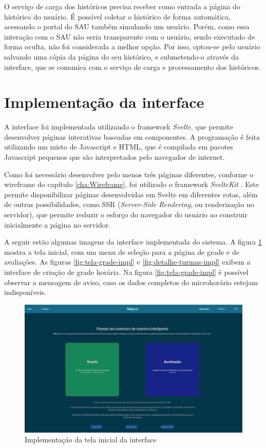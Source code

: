 O serviço de carga dos históricos precisa receber como entrada a página do histórico do usuário. É possível coletar o histórico de forma automática, acessando o portal do SAU também simulando um usuário. Porém, como essa interação com o SAU não seria transparente com o usuário, sendo executado de forma oculta, não foi considerada a melhor opção. Por isso, optou-se pelo usuário salvando uma cópia da página do seu histórico, e submetendo-o através da interface, que se comunica com o serviço de carga e processamento dos históricos. 

\section{Implementação da interface}
\label{sec:Implementação da interface}

A interface foi implementada utilizando o framework \textit{Svelte}, que permite desenvolver páginas interativas baseadas em componentes. A programação é feita utilizando um misto de Javascript e HTML, que é compilada em pacotes Javascript pequenos que são interpretados pelo navegador de internet. 

Como foi necessário desenvolver pelo menos três páginas diferentes, conforme o wireframe do capítulo \ref{cha:Wireframe}, foi utilizado o framework \textit{SvelteKit} \cite{site-sveltekit}. Este permite disponibilizar páginas desenvolvidas em Svelte em diferentes rotas, além de outras possibilidades, como SSR (\textit{Server-Side Rendering}, ou renderização no servidor), que permite reduzir o esforço do navegador do usuário ao construir inicialmente a página no servidor. 

A seguir estão algumas imagens da interface implementada do sistema. A figura \ref{fig:tela-inicial-impl} mostra a tela inicial, com um menu de seleção para a página de grade e de avaliações. As figuras \ref{fig:tela-grade-impl} e \ref{fig:detalhe-turmas-impl} exibem a interface de criação de grade horária. 
Na figura \ref{fig:tela-grade-impl} é possível observar a mensagem de aviso, caso os dados completos do microhorário estejam indisponíveis.

\begin{figure}[ht]
    \begin{center}
    \includegraphics[width=360pt]{figuras/tela-inicial.png}
    \caption{Implementação da tela inicial da interface}
    \label{fig:tela-inicial-impl}
    \end{center}
\end{figure}

